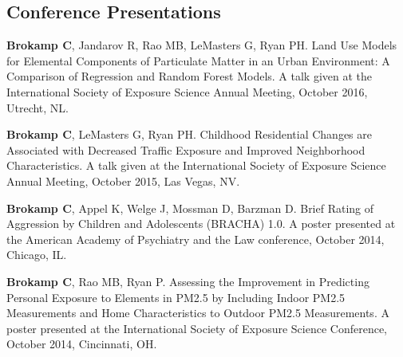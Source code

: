 \documentclass[margin,line]{res}
\newenvironment{list3}{
  \begin{list}{}{%
      \setlength{\itemsep}{0in}
      \setlength{\parsep}{0in} \setlength{\parskip}{0in}
      \setlength{\topsep}{0in} \setlength{\partopsep}{0in} 
      \setlength{\leftmargin}{0in}}}{\end{list}}
\begin{document}
\begin{resume}
\section{\sc Conference Presentations}
\begin{list3} \itemsep 4pt
\item[] \textbf{Brokamp C}, Jandarov R, Rao MB, LeMasters G, Ryan PH. Land Use Models for Elemental Components of Particulate Matter in an Urban Environment: A Comparison of Regression and Random Forest Models. A talk given at the International Society of Exposure Science Annual Meeting, October 2016, Utrecht, NL.
\item[] \textbf{Brokamp C}, LeMasters G, Ryan PH. Childhood Residential Changes are Associated with Decreased Traffic Exposure and Improved Neighborhood Characteristics. A talk given at the International Society of Exposure Science Annual Meeting, October 2015, Las Vegas, NV.
\item[] \textbf{Brokamp C}, Appel K, Welge J, Mossman D, Barzman D. Brief Rating of Aggression by Children and Adolescents (BRACHA) 1.0.  A poster presented at the American Academy of Psychiatry and the Law conference, October 2014, Chicago, IL. 
\item[] \textbf{Brokamp C}, Rao MB, Ryan P. Assessing the Improvement in Predicting Personal Exposure to Elements in PM2.5 by Including Indoor PM2.5 Measurements and Home Characteristics to Outdoor PM2.5 Measurements.  A poster presented at the International Society of Exposure Science Conference, October 2014, Cincinnati, OH.

\end{list3}
\end{resume}
\end{document}
